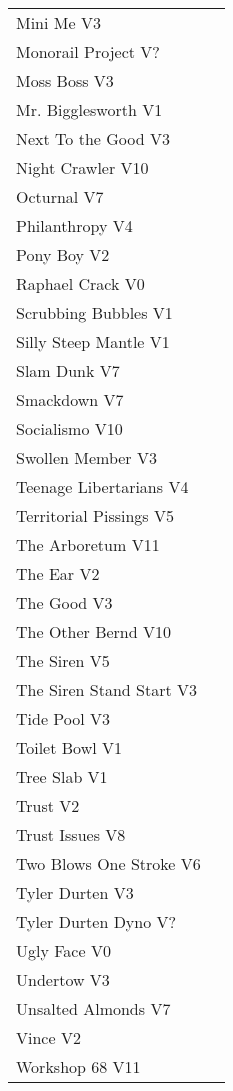 \begin{center}
\begin{supertabular}{lr}
Mini Me V3 & \pageref{rt:Mini Me} \\
Monorail Project V? & \pageref{rt:Monorail Project} \\
Moss Boss V3 & \pageref{rt:Moss Boss} \\
Mr. Bigglesworth V1 & \pageref{vr:Mr. Bigglesworth} \\
Next To the Good V3 & \pageref{rt:Next To the Good} \\
Night Crawler V10 & \pageref{rt:Night Crawler} \\
Octurnal V7 & \pageref{rt:Octurnal} \\
Philanthropy V4 & \pageref{rt:Philanthropy} \\
Pony Boy V2 & \pageref{rt:Pony Boy} \\
Raphael Crack V0 & \pageref{rt:Raphael Crack} \\
Scrubbing Bubbles V1 & \pageref{rt:Scrubbing Bubbles} \\
Silly Steep Mantle V1 & \pageref{rt:Silly Steep Mantle} \\
Slam Dunk V7 & \pageref{rt:Slam Dunk} \\
Smackdown V7 & \pageref{rt:Smackdown} \\
Socialismo V10 & \pageref{rt:Socialismo} \\
Swollen Member V3 & \pageref{rt:Swollen Member} \\
Teenage Libertarians V4 & \pageref{rt:Teenage Libertarians} \\
Territorial Pissings V5 & \pageref{rt:Territorial Pissings} \\
The Arboretum V11 & \pageref{rt:The Arboretum} \\
The Ear V2 & \pageref{rt:The Ear} \\
The Good V3 & \pageref{rt:The Good} \\
The Other Bernd V10 & \pageref{rt:The Other Bernd} \\
The Siren V5 & \pageref{rt:The Siren} \\
The Siren Stand Start V3 & \pageref{vr:The Siren Stand Start} \\
Tide Pool V3 & \pageref{rt:Tide Pool} \\
Toilet Bowl V1 & \pageref{rt:Toilet Bowl} \\
Tree Slab V1 & \pageref{rt:Tree Slab} \\
Trust V2 & \pageref{rt:Trust} \\
Trust Issues V8 & \pageref{rt:Trust Issues} \\
Two Blows One Stroke V6 & \pageref{rt:Two Blows One Stroke} \\
Tyler Durten V3 & \pageref{rt:Tyler Durten} \\
Tyler Durten Dyno V? & \pageref{vr:Tyler Durten Dyno} \\
Ugly Face V0 & \pageref{rt:Ugly Face} \\
Undertow V3 & \pageref{rt:Undertow} \\
Unsalted Almonds V7 & \pageref{rt:Unsalted Almonds} \\
Vince V2 & \pageref{rt:Vince} \\
Workshop 68 V11 & \pageref{rt:Workshop 68} \\
\end{supertabular}
\end{center}
